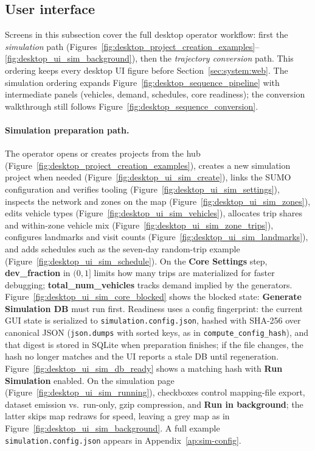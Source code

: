 

\subsection{User interface}\label{sec:system:desktop:ui}
Screens in this subsection cover the full desktop operator workflow: first the \emph{simulation} path (Figures~\ref{fig:desktop_project_creation_examples}--\ref{fig:desktop_ui_sim_background}), then the \emph{trajectory conversion} path. This ordering keeps every desktop UI figure before Section~\ref{sec:system:web}. The simulation ordering expands Figure~\ref{fig:desktop_sequence_pipeline} with intermediate panels (vehicles, demand, schedules, core readiness); the conversion walkthrough still follows Figure~\ref{fig:desktop_sequence_conversion}.

\paragraph{Simulation preparation path.}
The operator opens or creates projects from the hub (Figure~\ref{fig:desktop_project_creation_examples}), creates a new simulation project when needed (Figure~\ref{fig:desktop_ui_sim_create}), links the SUMO configuration and verifies tooling (Figure~\ref{fig:desktop_ui_sim_settings}), inspects the network and zones on the map (Figure~\ref{fig:desktop_ui_sim_zones}), edits vehicle types (Figure~\ref{fig:desktop_ui_sim_vehicles}), allocates trip shares and within-zone vehicle mix (Figure~\ref{fig:desktop_ui_sim_zone_trips}), configures landmarks and visit counts (Figure~\ref{fig:desktop_ui_sim_landmarks}), and adds schedules such as the seven-day random-trip example (Figure~\ref{fig:desktop_ui_sim_schedule}). On the \textbf{Core Settings} step, \textbf{dev\_fraction} in $(0,1]$ limits how many trips are materialized for faster debugging; \textbf{total\_num\_vehicles} tracks demand implied by the generators. Figure~\ref{fig:desktop_ui_sim_core_blocked} shows the blocked state: \textbf{Generate Simulation DB} must run first. Readiness uses a config fingerprint: the current GUI state is serialized to \texttt{simulation.config.json}, hashed with SHA-256 over canonical JSON (\texttt{json.dumps} with sorted keys, as in \texttt{compute\_config\_hash}), and that digest is stored in SQLite when preparation finishes; if the file changes, the hash no longer matches and the UI reports a stale DB until regeneration. Figure~\ref{fig:desktop_ui_sim_db_ready} shows a matching hash with \textbf{Run Simulation} enabled. On the simulation page (Figure~\ref{fig:desktop_ui_sim_running}), checkboxes control mapping-file export, dataset emission vs.\ run-only, gzip compression, and \textbf{Run in background}; the latter skips map redraws for speed, leaving a grey map as in Figure~\ref{fig:desktop_ui_sim_background}. A full example \texttt{simulation.config.json} appears in Appendix~\ref{ap:sim-config}.

